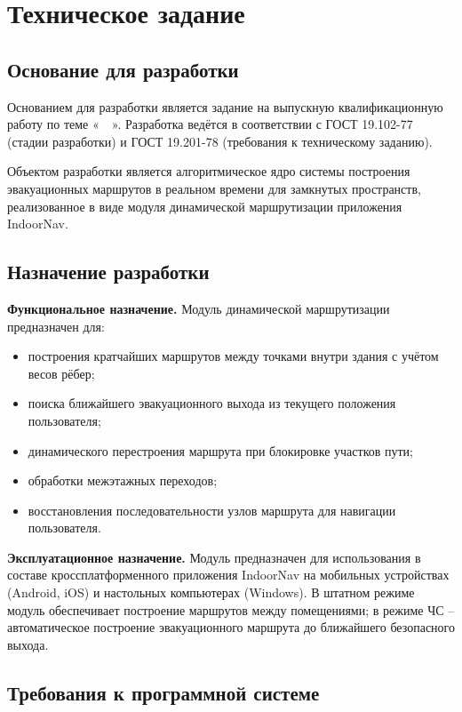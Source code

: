 \section{Техническое задание}

\subsection{Основание для разработки}

Основанием для разработки является задание на выпускную квалификационную работу по теме «\ \ ». Разработка ведётся в соответствии с ГОСТ 19.102-77 \cite{gost19102} (стадии разработки) и ГОСТ 19.201-78 \cite{gost19201} (требования к техническому заданию).

Объектом разработки является алгоритмическое ядро системы построения эвакуационных маршрутов в реальном времени для замкнутых пространств, реализованное в виде модуля динамической маршрутизации приложения IndoorNav.

\subsection{Назначение разработки}

\textbf{Функциональное назначение.} Модуль динамической маршрутизации предназначен для:
\begin{itemize}
\item построения кратчайших маршрутов между точками внутри здания с учётом весов рёбер;
\item поиска ближайшего эвакуационного выхода из текущего положения пользователя;
\item динамического перестроения маршрута при блокировке участков пути;
\item обработки межэтажных переходов;
\item восстановления последовательности узлов маршрута для навигации пользователя.
\end{itemize}

\textbf{Эксплуатационное назначение.} Модуль предназначен для использования в составе кроссплатформенного приложения IndoorNav на мобильных устройствах (Android, iOS) и настольных компьютерах (Windows). В штатном режиме модуль обеспечивает построение маршрутов между помещениями; в режиме ЧС -- автоматическое построение эвакуационного маршрута до ближайшего безопасного выхода.

\subsection{Требования к программной системе}

